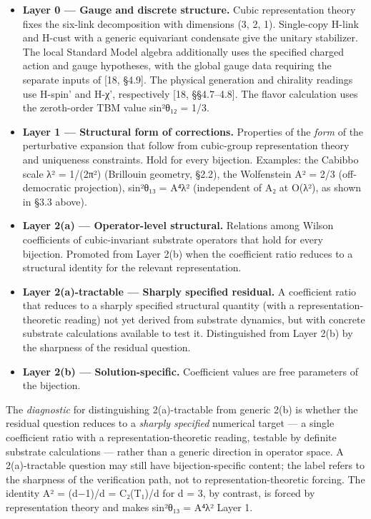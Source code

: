 \documentclass[
]{article}
\providecommand{\tightlist}{%
  \setlength{\itemsep}{0pt}\setlength{\parskip}{0pt}}
\begin{document}
\begin{itemize}
\tightlist
\item
  \textbf{Layer 0 --- Gauge and discrete structure.} Cubic
  representation theory fixes the six-link decomposition with dimensions
  (3, 2, 1). Single-copy H-link and H-cust with a generic equivariant
  condensate give the unitary stabilizer. The local Standard Model
  algebra additionally uses the specified charged action and gauge
  hypotheses, with the global gauge data requiring the separate inputs
  of {[}18, §4.9{]}. The physical generation and chirality readings use
  H-spin' and H-χ', respectively {[}18, §§4.7--4.8{]}. The flavor
  calculation uses the zeroth-order TBM value sin²θ₁₂ = 1/3.
\item
  \textbf{Layer 1 --- Structural form of corrections.} Properties of the
  \emph{form} of the perturbative expansion that follow from cubic-group
  representation theory and uniqueness constraints. Hold for every
  bijection. Examples: the Cabibbo scale λ² = 1/(2π²) (Brillouin
  geometry, §2.2), the Wolfenstein A² = 2/3 (off-democratic projection),
  sin²θ₁₃ = A⁴λ² (independent of A₂ at O(λ²), as shown in §3.3 above).
\item
  \textbf{Layer 2(a) --- Operator-level structural.} Relations among
  Wilson coefficients of cubic-invariant substrate operators that hold
  for every bijection. Promoted from Layer 2(b) when the coefficient
  ratio reduces to a structural identity for the relevant
  representation.
\item
  \textbf{Layer 2(a)-tractable --- Sharply specified residual.} A
  coefficient ratio that reduces to a sharply specified structural
  quantity (with a representation-theoretic reading) not yet derived
  from substrate dynamics, but with concrete substrate calculations
  available to test it. Distinguished from Layer 2(b) by the sharpness
  of the residual question.
\item
  \textbf{Layer 2(b) --- Solution-specific.} Coefficient values are free
  parameters of the bijection.
\end{itemize}

The \emph{diagnostic} for distinguishing 2(a)-tractable from generic
2(b) is whether the residual question reduces to a \emph{sharply
specified} numerical target --- a single coefficient ratio with a
representation-theoretic reading, testable by definite substrate
calculations --- rather than a generic direction in operator space. A
2(a)-tractable question may still have bijection-specific content; the
label refers to the sharpness of the verification path, not to
representation-theoretic forcing. The identity A² = (d−1)/d = C₂(T₁)/d
for d = 3, by contrast, is forced by representation theory and makes
sin²θ₁₃ = A⁴λ² Layer 1.
\end{document}
